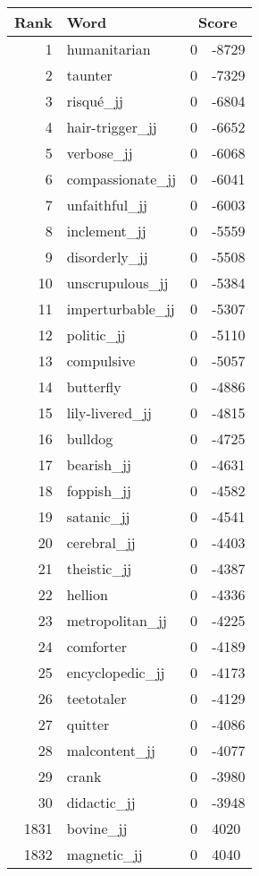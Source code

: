 \begin{longtable}[!htbp]{| rlr@{.}l |}
    \hline
    \textbf{Rank} & \textbf{Word} & \multicolumn{2}{c|}{\textbf{Score}} \\
    \hline
    \endhead
    1 & humanitarian & 0 & -8729 \\
    2 & taunter & 0 & -7329 \\
    3 & risqué\_jj & 0 & -6804 \\
    4 & hair-trigger\_jj & 0 & -6652 \\
    5 & verbose\_jj & 0 & -6068 \\
    6 & compassionate\_jj & 0 & -6041 \\
    7 & unfaithful\_jj & 0 & -6003 \\
    8 & inclement\_jj & 0 & -5559 \\
    9 & disorderly\_jj & 0 & -5508 \\
    10 & unscrupulous\_jj & 0 & -5384 \\
    11 & imperturbable\_jj & 0 & -5307 \\
    12 & politic\_jj & 0 & -5110 \\
    13 & compulsive & 0 & -5057 \\
    14 & butterfly & 0 & -4886 \\
    15 & lily-livered\_jj & 0 & -4815 \\
    16 & bulldog & 0 & -4725 \\
    17 & bearish\_jj & 0 & -4631 \\
    18 & foppish\_jj & 0 & -4582 \\
    19 & satanic\_jj & 0 & -4541 \\
    20 & cerebral\_jj & 0 & -4403 \\
    21 & theistic\_jj & 0 & -4387 \\
    22 & hellion & 0 & -4336 \\
    23 & metropolitan\_jj & 0 & -4225 \\
    24 & comforter & 0 & -4189 \\
    25 & encyclopedic\_jj & 0 & -4173 \\
    26 & teetotaler & 0 & -4129 \\
    27 & quitter & 0 & -4086 \\
    28 & malcontent\_jj & 0 & -4077 \\
    29 & crank & 0 & -3980 \\
    30 & didactic\_jj & 0 & -3948 \\
    1831 & bovine\_jj & 0 & 4020 \\
    1832 & magnetic\_jj & 0 & 4040 \\

\end{longtable}
